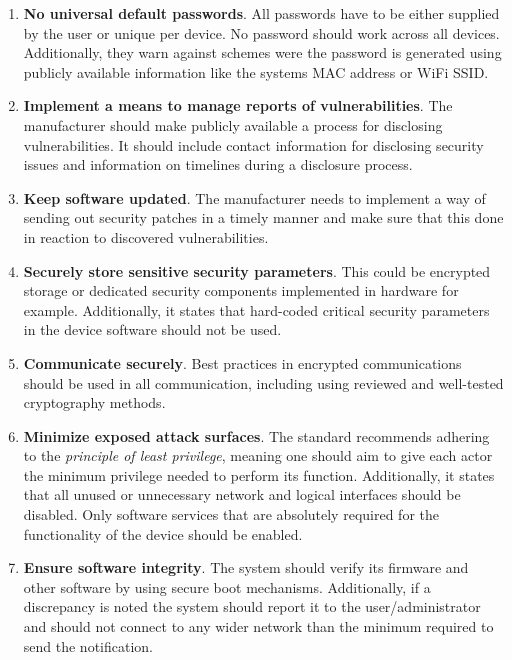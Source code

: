 \begin{enumerate}
    \item \textbf{No universal default passwords}. All passwords have to be either supplied by the user or unique per device. No password should work across all devices. Additionally, they warn against schemes were the password is generated using publicly available information like the systems MAC address or WiFi SSID.
    
    \item \textbf{Implement a means to manage reports of vulnerabilities}. The manufacturer should make publicly available a process for disclosing vulnerabilities. It should include contact information for disclosing security issues and information on timelines during a disclosure process.
    
    \item \textbf{Keep software updated}. The manufacturer needs to implement a way of sending out security patches in a timely manner and make sure that this done in reaction to discovered vulnerabilities.
    
    \item \textbf{Securely store sensitive security parameters}. This could be encrypted storage or dedicated security components implemented in hardware for example. Additionally, it states that hard-coded critical security parameters in the device software should not be used.
    
    \item \textbf{Communicate securely}. Best practices in encrypted communications should be used in all communication, including using reviewed and well-tested cryptography methods.
    
    \item \textbf{Minimize exposed attack surfaces}. The standard recommends adhering to the \textit{principle of least privilege}, meaning one should aim to give each actor the minimum privilege needed to perform its function. Additionally, it states that all unused or unnecessary network and logical interfaces should be disabled. Only software services that are absolutely required for the functionality of the device should be enabled.
    
    \item \textbf{Ensure software integrity}. The system should verify its firmware and other software by using secure boot mechanisms. Additionally, if a discrepancy is noted the system should report it to the user/administrator and should not connect to any wider network than the minimum required to send the notification.
    

\end{enumerate}
